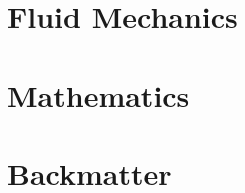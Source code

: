 
\frontmatter
\maketitle

\tableofcontents
\listofpuzzles

\mainmatter
\part{Fluid Mechanics}




\part{Mathematics}



\backmatter
\part*{Backmatter}

\nocite{*}




